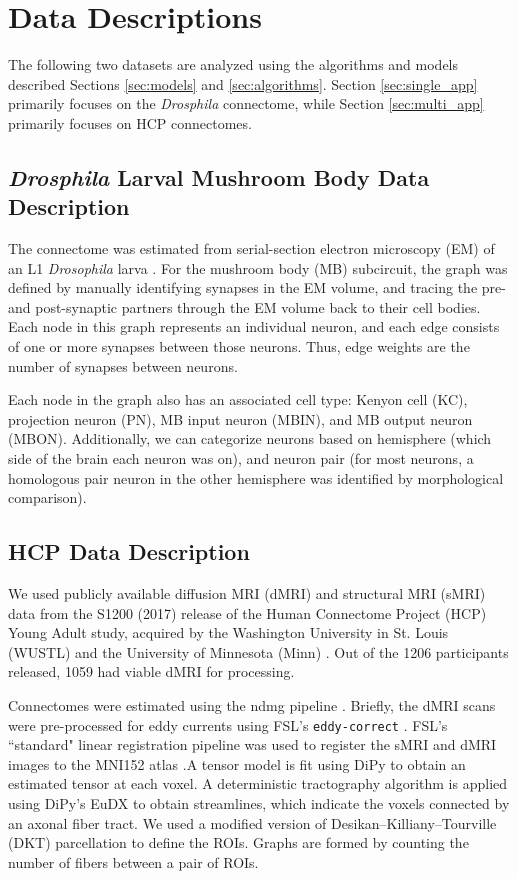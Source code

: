 \section{Data Descriptions}
The following two datasets are analyzed using the algorithms and models described Sections \ref{sec:models} and \ref{sec:algorithms}. Section \ref{sec:single_app} primarily focuses on the \textit{Drosphila} connectome, while Section \ref{sec:multi_app} primarily focuses on HCP connectomes.

\subsection{\textit{Drosphila} Larval Mushroom Body Data Description}\label{sec:drosphila}
The connectome was estimated from serial-section electron microscopy (EM) of an L1 \textit{Drosophila} larva \cite{eichler2017complete}. For the mushroom body (MB) subcircuit, the graph was defined by manually identifying synapses in the EM volume, and tracing the pre- and post-synaptic partners through the EM volume back to their cell bodies. Each node in this graph represents an individual neuron, and each edge consists of one or more synapses between those neurons. Thus, edge weights are the number of synapses between neurons. 

Each node in the graph also has an associated cell type: Kenyon cell (KC), projection neuron (PN), MB input neuron (MBIN), and MB output neuron (MBON). Additionally, we can categorize neurons based on hemisphere (which side of the brain each neuron was on), and neuron pair (for most neurons, a homologous pair neuron in the other hemisphere was identified by morphological comparison).

\subsection{HCP Data Description}\label{sec:hcp}
We used publicly available diffusion MRI (dMRI) and structural MRI (sMRI) data from the S1200 (2017) release of the Human Connectome Project (HCP) Young Adult study, acquired by the Washington University in St. Louis (WUSTL) and the University of Minnesota (Minn) \cite{hcp1, hcp2}. Out of the 1206 participants released, 1059 had viable dMRI for processing. 

Connectomes were estimated using the ndmg pipeline \cite{Kiar188706}. Briefly, the dMRI scans were pre-processed for eddy currents using FSL's \texttt{eddy-correct} \cite{fsl1}. FSL's ``standard" linear registration pipeline was used to register the sMRI and dMRI images to the MNI152 atlas \cite{fsl1,fsl2,fsl3,mni152}.A tensor model is fit using DiPy \cite{dipy} to obtain an estimated tensor at each voxel. A deterministic tractography algorithm is applied using DiPy's EuDX \cite{dipy,eudx} to obtain streamlines, which indicate the voxels connected by an axonal fiber tract. We used a modified version of Desikan–Killiany–Tourville (DKT) parcellation \cite{DKT}  to define the ROIs. Graphs are formed by counting the number of fibers between a pair of ROIs. 

